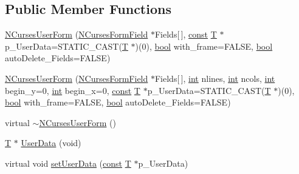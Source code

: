 \subsection*{Public Member Functions}
\begin{DoxyCompactItemize}
\item 
\hyperlink{class_n_curses_user_form_a2e0f2757504418445cb16fe63092aa42}{N\-Curses\-User\-Form} (\hyperlink{class_n_curses_form_field}{N\-Curses\-Form\-Field} $\ast$Fields\mbox{[}$\,$\mbox{]}, \hyperlink{term__entry_8h_a57bd63ce7f9a353488880e3de6692d5a}{const} \hyperlink{curses_8priv_8h_a5ef253115820acf7d27f3c5c3b02a0f0}{T} $\ast$p\-\_\-\-User\-Data=S\-T\-A\-T\-I\-C\-\_\-\-C\-A\-S\-T(\hyperlink{curses_8priv_8h_a5ef253115820acf7d27f3c5c3b02a0f0}{T} $\ast$)(0), \hyperlink{term__entry_8h_a002004ba5d663f149f6c38064926abac}{bool} with\-\_\-frame=F\-A\-L\-S\-E, \hyperlink{term__entry_8h_a002004ba5d663f149f6c38064926abac}{bool} auto\-Delete\-\_\-\-Fields=F\-A\-L\-S\-E)
\item 
\hyperlink{class_n_curses_user_form_ac58a6561847242a6a91d3c97679db480}{N\-Curses\-User\-Form} (\hyperlink{class_n_curses_form_field}{N\-Curses\-Form\-Field} $\ast$Fields\mbox{[}$\,$\mbox{]}, \hyperlink{term__entry_8h_ad65b480f8c8270356b45a9890f6499ae}{int} nlines, \hyperlink{term__entry_8h_ad65b480f8c8270356b45a9890f6499ae}{int} ncols, \hyperlink{term__entry_8h_ad65b480f8c8270356b45a9890f6499ae}{int} begin\-\_\-y=0, \hyperlink{term__entry_8h_ad65b480f8c8270356b45a9890f6499ae}{int} begin\-\_\-x=0, \hyperlink{term__entry_8h_a57bd63ce7f9a353488880e3de6692d5a}{const} \hyperlink{curses_8priv_8h_a5ef253115820acf7d27f3c5c3b02a0f0}{T} $\ast$p\-\_\-\-User\-Data=S\-T\-A\-T\-I\-C\-\_\-\-C\-A\-S\-T(\hyperlink{curses_8priv_8h_a5ef253115820acf7d27f3c5c3b02a0f0}{T} $\ast$)(0), \hyperlink{term__entry_8h_a002004ba5d663f149f6c38064926abac}{bool} with\-\_\-frame=F\-A\-L\-S\-E, \hyperlink{term__entry_8h_a002004ba5d663f149f6c38064926abac}{bool} auto\-Delete\-\_\-\-Fields=F\-A\-L\-S\-E)
\item 
virtual \hyperlink{class_n_curses_user_form_a0775112b47a0aa469f6413fd2aa0e9f1}{$\sim$\-N\-Curses\-User\-Form} ()
\item 
\hyperlink{curses_8priv_8h_a5ef253115820acf7d27f3c5c3b02a0f0}{T} $\ast$ \hyperlink{class_n_curses_user_form_a06a8e2d0d90254917b1f3fe6e8399584}{User\-Data} (void)
\item 
virtual void \hyperlink{class_n_curses_user_form_ac03470d6bfc7318a5a596e58c6a946f8}{set\-User\-Data} (\hyperlink{term__entry_8h_a57bd63ce7f9a353488880e3de6692d5a}{const} \hyperlink{curses_8priv_8h_a5ef253115820acf7d27f3c5c3b02a0f0}{T} $\ast$p\-\_\-\-User\-Data)
\end{DoxyCompactItemize}
